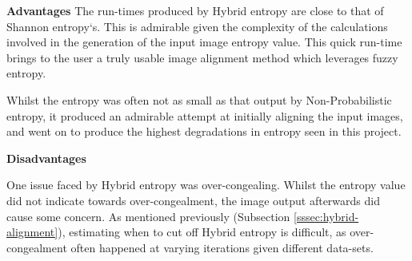 \textbf{Advantages}
The run-times produced by Hybrid entropy are close to that of Shannon entropy`s. This is admirable given the complexity of the calculations involved in the generation of the input image entropy value. This quick run-time brings to the user a truly usable image alignment method which leverages fuzzy entropy.

Whilst the entropy was often not as small as that output by Non-Probabilistic entropy, it produced an admirable attempt at initially aligning the input images, and went on to produce the highest degradations in entropy seen in this project.

\textbf{Disadvantages}

One issue faced by Hybrid entropy was over-congealing. Whilst the entropy value did not indicate towards over-congealment, the image output afterwards did cause some concern. As mentioned previously (Subsection \ref{sssec:hybrid-alignment}), estimating when to cut off Hybrid entropy is difficult, as over-congealment often happened at varying iterations given different data-sets.
